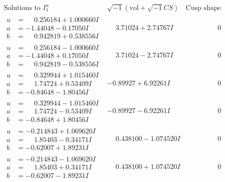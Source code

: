 \documentclass[1p]{elsarticle_modified}
\theoremstyle{definition}
\newcommand{\I}{\sqrt{-1}}
\begin{document}
$$\begin{array}{c|c|c}  
\text{Solutions to }I^u_{1}& \I (\text{vol} + \sqrt{-1}CS) & \text{Cusp shape}\\
 \hline 
\begin{aligned}
u &= \phantom{-}0.256184 + 1.000660 I \\
a &= -1.44048 - 0.17050 I \\
b &= \phantom{-}0.942819 + 0.538556 I\end{aligned}
 & \phantom{-}3.71024 + 2.74767 I & \phantom{-0.000000 } 0 \\ \hline\begin{aligned}
u &= \phantom{-}0.256184 - 1.000660 I \\
a &= -1.44048 + 0.17050 I \\
b &= \phantom{-}0.942819 - 0.538556 I\end{aligned}
 & \phantom{-}3.71024 - 2.74767 I & \phantom{-0.000000 } 0 \\ \hline\begin{aligned}
u &= \phantom{-}0.329944 + 1.015460 I \\
a &= \phantom{-}1.74724 + 0.53409 I \\
b &= -0.84648 - 1.80456 I\end{aligned}
 & -0.89927 + 6.92261 I & \phantom{-0.000000 } 0 \\ \hline\begin{aligned}
u &= \phantom{-}0.329944 - 1.015460 I \\
a &= \phantom{-}1.74724 - 0.53409 I \\
b &= -0.84648 + 1.80456 I\end{aligned}
 & -0.89927 - 6.92261 I & \phantom{-0.000000 } 0 \\ \hline\begin{aligned}
u &= -0.214843 + 1.069620 I \\
a &= \phantom{-}1.85403 - 0.34171 I \\
b &= -0.62007 + 1.89231 I\end{aligned}
 & \phantom{-}0.438100 - 1.074520 I & \phantom{-0.000000 } 0 \\ \hline\begin{aligned}
u &= -0.214843 - 1.069620 I \\
a &= \phantom{-}1.85403 + 0.34171 I \\
b &= -0.62007 - 1.89231 I\end{aligned}
 & \phantom{-}0.438100 + 1.074520 I & \phantom{-0.000000 } 0 \\ \hline\begin{aligned}

\end{aligned}
\end{array}$$
\end{document}
